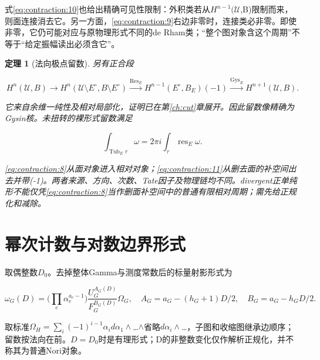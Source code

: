 \documentclass[11pt,a4paper,oneside]{ctexrep}
\theoremstyle{cnplain}
\newtheorem{theorem}{定理}[chapter]
\theoremstyle{definition}
\theoremstyle{remark}
\begin{document}
式\eqref{eq:contraction:10}也给出精确可见性限制：外积类若从\(H^{n- 1}(\)\(\mathcal U\),B)限制而来，则面连接消去它。另一方面，\eqref{eq:contraction:9}右边非零时，连接类必非零。即使非零，它仍可能对应与原物理形式不同的de Rham类；``整个图对象含这个周期''不等于``给定振幅读出必须含它''。

\begin{theorem}[法向极点留数]

\label{thm:contraction:3.2} 另有正合段

\begin{equation}
H^n(\mathcal U,B)\longrightarrow
 H^n(\mathcal U\setminus E^\circ,B\setminus E^\circ)
 \xrightarrow{\operatorname{Res}_E}
 H^{n-1}(E^\circ,B_E)(-1)
 \xrightarrow{\operatorname{Gys}_E}H^{n+1}(\mathcal U,B).          \label{eq:contraction:11}
\end{equation}

它来自余维一纯性及相对局部化，证明已在第\ref{ch:cut}章展开。因此留数像精确为Gysin核。未扭转的裸形式留数满足

\begin{equation}
\int_{\operatorname{Tub}_E\tau}\omega
                     =2\pi i\int_\tau\operatorname{res}_E\omega.              \label{eq:contraction:12}
\end{equation}

\eqref{eq:contraction:8}从面对象进入相对对象；\eqref{eq:contraction:11}从删去面的补空间出去并带(-1)。两者来源、方向、次数、Tate因子及物理链均不同。divergent正单纯形不能仅凭\eqref{eq:contraction:8}当作删面补空间中的普通有限相对周期；需先给正规化和减除。

\end{theorem}

\section{幂次计数与对数边界形式}\label{sec:contraction:4}

取偶整数\(D_0\)。去掉整体Gamma与测度常数后的标量射影形式为

\begin{equation}
\omega_G(D)=\Big(\prod_e\alpha_e^{a_e-1}\Big)
       \frac{U_G^{A_G(D)}}{F_G^{B_G(D)}}\Omega_G,
 \quad A_G=a_G-(h_G+1)D/2,\quad B_G=a_G-h_GD/2.                  \label{eq:contraction:13}
\end{equation}

取标准\(\Omega _H=\sum _i(- 1)^{i- 1}\alpha _i d\alpha _1\wedge \)\ldots{}\(\wedge \)省略\(d\alpha _i\wedge \)\ldots，子图和收缩图继承边顺序；留数按法向在前。\(D=D_0\)时是有理形式；D的非整数变化仅作解析正规化，并不称其为普通Nori对象。
\end{document}
